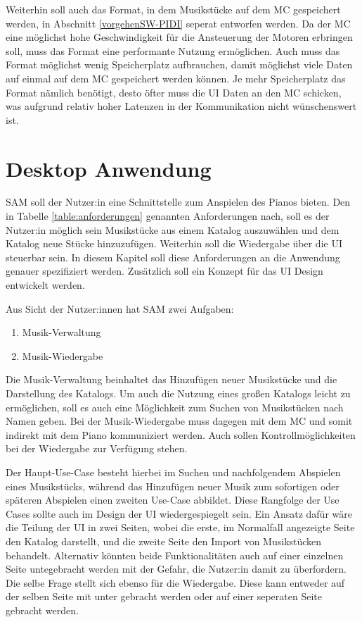 Weiterhin soll auch das Format, in dem Musikstücke auf dem \ac{MC} gespeichert werden, in Abschnitt \ref{vorgehenSW-PIDI} seperat entworfen werden.
Da der \ac{MC} eine möglichst hohe Geschwindigkeit für die Ansteuerung der Motoren erbringen soll, muss das Format eine performante Nutzung ermöglichen.
Auch muss das Format möglichst wenig Speicherplatz aufbrauchen, damit möglichst viele Daten auf einmal auf dem \ac{MC} gespeichert werden können.
Je mehr Speicherplatz das Format nämlich benötigt, desto öfter muss die \ac{UI} Daten an den \ac{MC} schicken, was aufgrund relativ hoher Latenzen in der Kommunikation nicht wünschenswert ist.


\section{Desktop Anwendung} \label{vorgehenSW-UI}


\ac{SAM} soll der Nutzer:in eine Schnittstelle zum Anspielen des Pianos bieten.
Den in Tabelle \ref{table:anforderungen} genannten Anforderungen nach, soll es der Nutzer:in möglich sein Musikstücke aus einem Katalog auszuwählen und dem Katalog neue Stücke hinzuzufügen.
Weiterhin soll die Wiedergabe über die \ac{UI} steuerbar sein.
In diesem Kapitel soll diese Anforderungen an die Anwendung genauer spezifiziert werden.
Zusätzlich soll ein Konzept für das \ac{UI} Design entwickelt werden.

Aus Sicht der Nutzer:innen hat \ac{SAM} zwei Aufgaben:
\begin{enumerate}
    \item Musik-Verwaltung
    \item Musik-Wiedergabe
\end{enumerate}

Die Musik-Verwaltung beinhaltet das Hinzufügen neuer Musikstücke und die Darstellung des Katalogs.
Um auch die Nutzung eines großen Katalogs leicht zu ermöglichen, soll es auch eine Möglichkeit zum Suchen von Musikstücken nach Namen geben.
Bei der Musik-Wiedergabe muss dagegen mit dem \ac{MC} und somit indirekt mit dem Piano kommuniziert werden.
Auch sollen Kontrollmöglichkeiten bei der Wiedergabe zur Verfügung stehen.

Der Haupt-Use-Case besteht hierbei im Suchen und nachfolgendem Abspielen eines Musikstücks, während das Hinzufügen neuer Musik zum sofortigen oder späteren Abspielen einen zweiten Use-Case abbildet.
Diese Rangfolge der Use Cases sollte auch im Design der \ac{UI} wiedergespiegelt sein.
Ein Ansatz dafür wäre die Teilung der \ac{UI} in zwei Seiten, wobei die erste, im Normalfall angezeigte Seite den Katalog darstellt, und die zweite Seite den Import von Musikstücken behandelt.
Alternativ könnten beide Funktionalitäten auch auf einer einzelnen Seite untegebracht werden mit der Gefahr, die Nutzer:in damit zu überfordern.
Die selbe Frage stellt sich ebenso für die Wiedergabe.
Diese kann entweder auf der selben Seite mit unter gebracht werden oder auf einer seperaten Seite gebracht werden.

